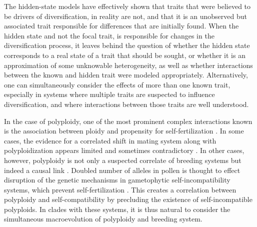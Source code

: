 The hidden-state  models have effectively shown that traits that were believed to be drivers of diversification, in reality are not, and that it is an unobserved but associated trait responsible for differences that are initially found.  When the hidden state and not the focal trait, is responsible for changes in the diversification process, it leaves behind the question of whether the hidden state corresponds to a real state of a trait that should be sought, or whether it is an approximation of some unknowable heterogeneity, as well as whether interactions between the known and hidden trait were modeled appropriately.
Alternatively, one can simultaneously consider the effects of more than one known trait, especially in systems where multiple traits are suspected to influence diversification, and where interactions between those traits are well understood.


In the case of polyploidy,  one of the most prominent complex interactions known is the association between ploidy and propensity for self-fertilization \citep{stebbins1950}. %
In some cases, the evidence for a correlated shift in mating system along with polyploidization appears limited and sometimes contradictory \citep{barringer2007, barrett2008, husband2008}.
In other cases, however, polyploidy is not only a suspected correlate of breeding systems but indeed a causal link \citep{stout1942, lewis1947}.
Doubled number of alleles in pollen is thought to effect disruption of the genetic mechanisms in gametophytic self-incompatibility systems, which prevent self-fertilization \citep{entani1999, tsukamoto2005, kubo2010}. 
This creates a correlation between polyploidy and self-compatibility by precluding the existence of self-incompatible polyploids.
In clades with these systems, it is thus natural to consider the simultaneous macroevolution of polyploidy and breeding system.

